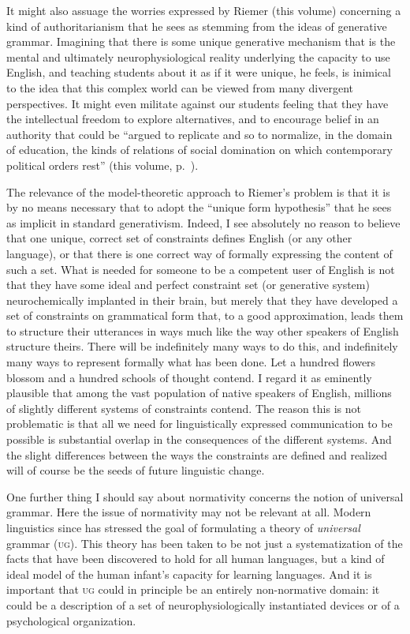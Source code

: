 \documentclass[output=paper]{langscibook}
\begin{document}
It might also assuage the worries expressed by Riemer (this volume) concerning a kind of authoritarianism that he sees as stemming from the ideas of generative grammar. Imagining that there is some unique generative mechanism that is the mental and ultimately neurophysiological reality underlying the capacity to use English, and teaching students about it as if it were unique, he feels, is inimical to the idea that this complex world can be viewed from many divergent perspectives. It might even militate against our students feeling that they have the intellectual freedom to explore alternatives, and to encourage belief in an authority that could be ``argued to replicate and so to normalize, in the domain of education, the kinds of relations of social domination on which contemporary political orders rest'' (this volume, p.~\pageref{q:riemer:domination}).

The relevance of the model-theoretic approach to Riemer's problem is that it is by no means necessary that to adopt the ``unique form hypothesis'' that he sees as implicit in standard generativism. Indeed, I see absolutely no reason to believe that one unique, correct set of constraints defines English (or any other language), or that there is one correct way of formally expressing the content of such a set. What is needed for someone to be a competent user of English is not that they have some ideal and perfect constraint set (or generative system) neurochemically implanted in their brain, but merely that they have developed a set of constraints on grammatical form that, to a good approximation, leads them to structure their utterances in ways much like the way other speakers of English structure theirs. There will be indefinitely many ways to do this, and indefinitely many ways to represent formally what has been done. Let a hundred flowers blossom and a hundred schools of thought contend. I regard it as eminently plausible that among the vast population of native speakers of English, millions of slightly different systems of constraints contend. The reason this is not problematic is that all we need for linguistically expressed communication to be possible is substantial overlap in the consequences of the different systems. And the slight differences between the ways the constraints are defined and realized will of course be the seeds of future linguistic change.

One further thing I should say about normativity concerns the notion of universal grammar. Here the issue of normativity may not be relevant at all. Modern linguistics since \citet{Chomsky65} has stressed the goal of formulating a theory of \emph{universal} grammar (\textsc{ug}).  This theory has been taken to be not just a systematization of the facts that have been discovered to hold for all human languages, but a kind of ideal model of the human infant's capacity for learning languages.  And it is important that \textsc{ug} could in principle be an entirely non-normative domain: it could be a description of a set of neurophysiologically instantiated devices or of a psychological organization.
\end{document}
